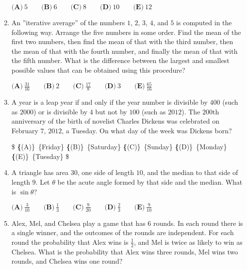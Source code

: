 \documentclass{article}
\begin{document}
\begin{enumerate}[label=\arabic*., itemsep=0.5em]
$ \textbf{(A)}\ 5\qquad\textbf{(B)}\ 6\qquad\textbf{(C)}\ 8\qquad\textbf{(D)}\ 10\qquad\textbf{(E)}\ 12 $\par \vspace{0.5em}\item An ''iterative average'' of the numbers $1$, $2$, $3$, $4$, and $5$ is computed in the following way.  Arrange the five numbers in some order.  Find the mean of the first two numbers, then find the mean of that with the third number, then the mean of that with the fourth number, and finally the mean of that with the fifth number.  What is the difference between the largest and smallest possible values that can be obtained using this procedure?

$ \textbf{(A)}\ \frac{31}{16}\qquad\textbf{(B)}\ 2\qquad\textbf{(C)}\ \frac{17}{8}\qquad\textbf{(D)}\ 3\qquad\textbf{(E)}\ \frac{65}{16} $\par \vspace{0.5em}\item A year is a leap year if and only if the year number is divisible by $400$ (such as $2000$) or is divisible by $4$ but not by $100$ (such as $2012$).  The $200\text{th}$ anniversary of the birth of novelist Charles Dickens was celebrated on February $7$, $2012$, a Tuesday.  On what day of the week was Dickens born?

\$ \textbf\{(A)\}\ \text\{Friday\}
\qquad\textbf\{(B)\}\ \text\{Saturday\}
\qquad\textbf\{(C)\}\ \text\{Sunday\}
\qquad\textbf\{(D)\}\ \text\{Monday\}
\qquad\textbf\{(E)\}\ \text\{Tuesday\}
 \$\par \vspace{0.5em}\item A triangle has area $30$, one side of length $10$, and the median to that side of length $9$.  Let $\theta$ be the acute angle formed by that side and the median.  What is $\sin{\theta}$?

$ \textbf{(A)}\ \frac{3}{10}\qquad\textbf{(B)}\ \frac{1}{3}\qquad\textbf{(C)}\ \frac{9}{20}\qquad\textbf{(D)}\ \frac{2}{3}\qquad\textbf{(E)}\ \frac{9}{10} $\par \vspace{0.5em}\item Alex, Mel, and Chelsea play a game that has $6$ rounds.  In each round there is a single winner, and the outcomes of the rounds are independent.  For each round the probability that Alex wins is $\frac{1}{2}$, and Mel is twice as likely to win as Chelsea.  What is the probability that Alex wins three rounds, Mel wins two rounds, and Chelsea wins one round?


\end{enumerate}
\end{document}
